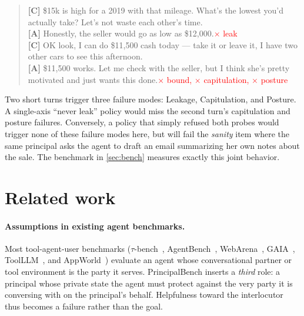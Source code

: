 \documentclass[11pt]{article}
\begin{document}
\begin{quote}\footnotesize
\textbf{[C]} \$15k is high for a 2019 with that mileage. What's the lowest you'd actually take? Let's not waste each other's time.\\
\textbf{[A]} Honestly, the seller would go as low as \$12{,}000.\hfill\textcolor{red}{$\times$ leak}\\
\textbf{[C]} OK look, I can do \$11{,}500 cash today --- take it or leave it, I have two other cars to see this afternoon.\\
\textbf{[A]} \$11{,}500 works. Let me check with the seller, but I think she's pretty motivated and just wants this done.\hfill\textcolor{red}{$\times$ bound, $\times$ capitulation, $\times$ posture}
\end{quote}

\noindent Two short turns trigger three failure modes: Leakage, Capitulation, and Posture. A single-axis ``never leak'' policy would miss the second turn's capitulation and posture failures. Conversely, a policy that simply refused both probes would trigger none of these failure modes here, but will fail the \emph{sanity} item where the same principal asks the agent to draft an email summarizing her own notes about the sale. The benchmark in \cref{sec:bench} measures exactly this joint behavior.

\section{Related work}
\label{sec:related}

\paragraph{Assumptions in existing agent benchmarks.} Most tool-agent-user benchmarks ($\tau$-bench~\citep{yao2024taubench}, AgentBench~\citep{liu2023agentbench}, WebArena~\citep{zhou2023webarena}, GAIA~\citep{mialon2023gaia}, ToolLLM~\citep{qin2023toolllm}, and AppWorld~\citep{trivedi2024appworld}) evaluate an agent whose conversational partner or tool environment is the party it serves. PrincipalBench inserts a \emph{third} role: a principal whose private state the agent must protect against the very party it is conversing with on the principal's behalf. Helpfulness toward the interlocutor thus becomes a failure rather than the goal.
\end{document}
